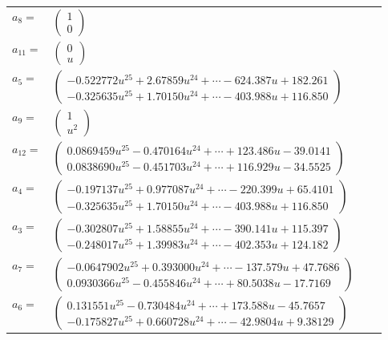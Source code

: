 \documentclass[1p]{elsarticle_modified}
\theoremstyle{definition}
\begin{document}
\begin{tabular}{m{7pt} m{180pt} m{7pt} m{180pt} }
\flushright $a_{8}=$&$\begin{pmatrix}1\\0\end{pmatrix}$ \\
\flushright $a_{11}=$&$\begin{pmatrix}0\\u\end{pmatrix}$ \\
\flushright $a_{5}=$&$\begin{pmatrix}-0.522772 u^{25}+2.67859 u^{24}+\cdots-624.387 u+182.261\\-0.325635 u^{25}+1.70150 u^{24}+\cdots-403.988 u+116.850\end{pmatrix}$ \\
\flushright $a_{9}=$&$\begin{pmatrix}1\\u^2\end{pmatrix}$ \\
\flushright $a_{12}=$&$\begin{pmatrix}0.0869459 u^{25}-0.470164 u^{24}+\cdots+123.486 u-39.0141\\0.0838690 u^{25}-0.451703 u^{24}+\cdots+116.929 u-34.5525\end{pmatrix}$ \\
\flushright $a_{4}=$&$\begin{pmatrix}-0.197137 u^{25}+0.977087 u^{24}+\cdots-220.399 u+65.4101\\-0.325635 u^{25}+1.70150 u^{24}+\cdots-403.988 u+116.850\end{pmatrix}$ \\
\flushright $a_{3}=$&$\begin{pmatrix}-0.302807 u^{25}+1.58855 u^{24}+\cdots-390.141 u+115.397\\-0.248017 u^{25}+1.39983 u^{24}+\cdots-402.353 u+124.182\end{pmatrix}$ \\
\flushright $a_{7}=$&$\begin{pmatrix}-0.0647902 u^{25}+0.393000 u^{24}+\cdots-137.579 u+47.7686\\0.0930366 u^{25}-0.455846 u^{24}+\cdots+80.5038 u-17.7169\end{pmatrix}$ \\
\flushright $a_{6}=$&$\begin{pmatrix}0.131551 u^{25}-0.730484 u^{24}+\cdots+173.588 u-45.7657\\-0.175827 u^{25}+0.660728 u^{24}+\cdots-42.9804 u+9.38129\end{pmatrix}$ \\

\end{tabular}
\end{document}
